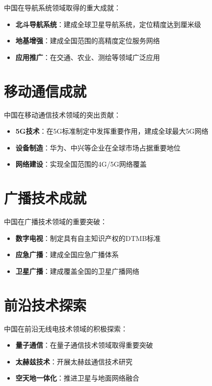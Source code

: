 \documentclass[12pt,UTF8]{ctexbook}
\begin{document}
中国在导航系统领域取得的重大成就：

\begin{itemize}[leftmargin=3.5em]
    \item \textbf{北斗导航系统}：建成全球卫星导航系统，定位精度达到厘米级
    \item \textbf{地基增强}：建成全国范围的高精度定位服务网络
    \item \textbf{应用推广}：在交通、农业、测绘等领域广泛应用
\end{itemize}

\section{移动通信成就}

中国在移动通信技术领域的突出贡献：

\begin{itemize}[leftmargin=3.5em]
    \item \textbf{5G技术}：在5G标准制定中发挥重要作用，建成全球最大5G网络
    \item \textbf{设备制造}：华为、中兴等企业在全球市场占据重要地位
    \item \textbf{网络建设}：实现全国范围的4G/5G网络覆盖
\end{itemize}

\section{广播技术成就}

中国在广播技术领域的重要突破：

\begin{itemize}[leftmargin=3.5em]
    \item \textbf{数字电视}：制定具有自主知识产权的DTMB标准
    \item \textbf{应急广播}：建成全国应急广播体系
    \item \textbf{卫星广播}：建成覆盖全国的卫星广播网络
\end{itemize}

\section{前沿技术探索}

中国在前沿无线电技术领域的积极探索：

\begin{itemize}[leftmargin=3.5em]
    \item \textbf{量子通信}：在量子通信技术领域取得重要突破
    \item \textbf{太赫兹技术}：开展太赫兹通信技术研究
    \item \textbf{空天地一体化}：推进卫星与地面网络融合
\end{itemize}
\end{document}
